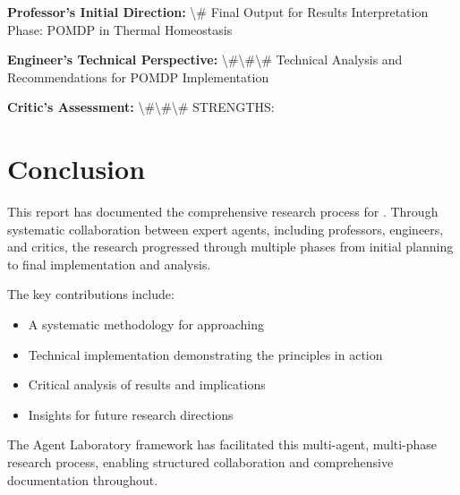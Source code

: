 \documentclass[11pt,a4paper]{article}
\begin{document}
\textbf{Professor's Initial Direction:} \textbackslash{}# Final Output for Results Interpretation Phase: POMDP in Thermal Homeostasis


\textbf{Engineer's Technical Perspective:} \textbackslash{}#\textbackslash{}#\textbackslash{}# Technical Analysis and Recommendations for POMDP Implementation


\textbf{Critic's Assessment:} \textbackslash{}#\textbackslash{}#\textbackslash{}# STRENGTHS:


\section{Conclusion}

This report has documented the comprehensive research process for . Through systematic collaboration between expert agents, including professors, engineers, and critics, the research progressed through multiple phases from initial planning to final implementation and analysis.

The key contributions include:
\begin{itemize}
    \item A systematic methodology for approaching 
    \item Technical implementation demonstrating the principles in action
    \item Critical analysis of results and implications
    \item Insights for future research directions
\end{itemize}

The Agent Laboratory framework has facilitated this multi-agent, multi-phase research process, enabling structured collaboration and comprehensive documentation throughout.
\end{document}

